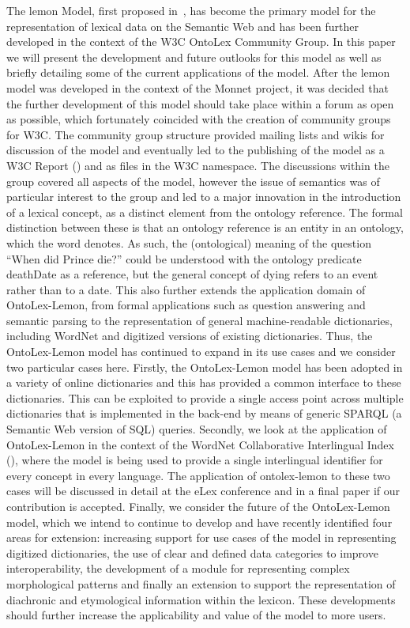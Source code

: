 \documentclass[12pt,a4paper]{elex2017}
\begin{document}
The lemon Model, first proposed in~\cite{mccrae2012interchanging}, has become the primary
model for the representation of lexical data on the Semantic Web and has been
further developed in the context of the W3C OntoLex Community Group. In this
paper we will present the development and future outlooks for this model as well
as briefly detailing some of the current applications of the model. After the
lemon model was developed in the context of the Monnet project, it was decided
that the further development of this model should take place within a forum as
open as possible, which fortunately coincided with the creation of community
groups for W3C. The community group structure provided mailing lists and wikis
for discussion of the model and eventually led to the publishing of the model as
a W3C Report (\cite{cimiano2016lexicon}) and as files in the W3C namespace. The
discussions within the group covered all aspects of the model, however the issue
of semantics was of particular interest to the group and led to a major
innovation in the introduction of a lexical concept, as a distinct element from
the ontology reference. The formal distinction between these is that an ontology
reference is an entity in an ontology, which the word denotes.  As such, the
(ontological) meaning of  the question “When did Prince die?” could be
understood with the ontology predicate deathDate as a reference, but the general
concept of dying refers to an event rather than to a date. This also further
extends the application domain of OntoLex-Lemon, from formal applications such
as question answering and semantic parsing to the representation of general
machine-readable dictionaries, including WordNet and digitized versions of
existing dictionaries.
Thus, the OntoLex-Lemon model has continued to expand in its use cases and we
consider two particular cases here. Firstly, the OntoLex-Lemon model has been
adopted in a variety of online dictionaries and this has provided a common
interface to these dictionaries. This can be exploited to provide a single
access point across multiple dictionaries that is implemented in the back-end by
means of generic SPARQL (a Semantic Web version of SQL) queries. Secondly, we
look at the application of OntoLex-Lemon in the context of the WordNet
Collaborative Interlingual Index (\cite{bond2016cili}), where the model is being
used to provide a single interlingual identifier for every concept in every
language. The application of ontolex-lemon to these two cases will be discussed
in detail at the eLex conference and in a final paper if our contribution is
accepted.
Finally, we consider the future of the OntoLex-Lemon model, which we intend to
continue to develop and have recently identified four areas for extension:
increasing support for use cases of the model in representing digitized
dictionaries, the use of clear and defined data categories to improve
interoperability, the development of a module for representing complex
morphological patterns and finally an extension to support the representation of
diachronic and etymological information within the lexicon. These developments
should further increase the applicability and value of the model to more users.
\end{document}
